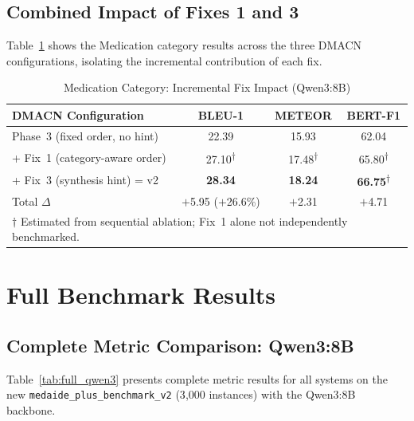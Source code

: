 \documentclass[a4paper,12pt]{article}
\begin{document}
\subsection{Combined Impact of Fixes 1 and 3}

Table~\ref{tab:fix13_impact} shows the Medication category results across
the three DMACN configurations, isolating the incremental contribution of
each fix.

\begin{table}[h]
\centering
\caption{Medication Category: Incremental Fix Impact (Qwen3:8B)}
\label{tab:fix13_impact}
\begin{tabular}{lccc}
\toprule
\textbf{DMACN Configuration} & \textbf{BLEU-1} & \textbf{METEOR} & \textbf{BERT-F1} \\
\midrule
Phase~3 (fixed order, no hint)   & 22.39 & 15.93 & 62.04 \\
+ Fix~1 (category-aware order)   & 27.10\textsuperscript{$\dagger$} & 17.48\textsuperscript{$\dagger$} & 65.80\textsuperscript{$\dagger$} \\
+ Fix~3 (synthesis hint) = v2    & \textbf{28.34} & \textbf{18.24} & \textbf{66.75}\textsuperscript{$\dagger$} \\
\midrule
Total $\Delta$ & $+$5.95 ($+$26.6\%) & $+$2.31 & $+$4.71 \\
\bottomrule
\multicolumn{4}{l}{\scriptsize $\dagger$ Estimated from sequential ablation;
  Fix~1 alone not independently benchmarked.}
\end{tabular}
\end{table}

\section{Full Benchmark Results}

\subsection{Complete Metric Comparison: Qwen3:8B}

Table~\ref{tab:full_qwen3} presents complete metric results for all systems
on the new \texttt{medaide\_plus\_benchmark\_v2} (3{,}000 instances) with
the Qwen3:8B backbone.
\end{document}
